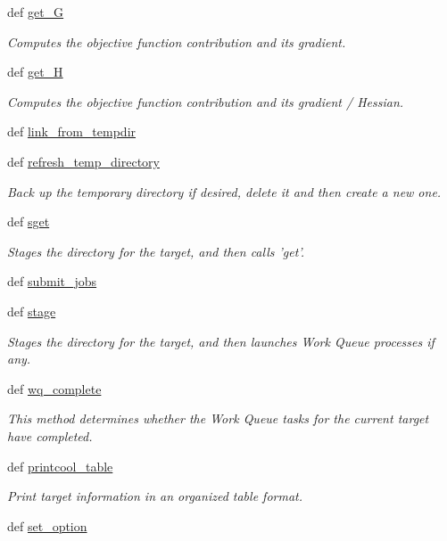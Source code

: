 \begin{DoxyCompactItemize}
def \hyperlink{classforcebalance_1_1target_1_1Target_afa8cc38c8bba8861c072e789717aa049}{get\-\_\-\-G}
\begin{DoxyCompactList}\small\item\em Computes the objective function contribution and its gradient. \end{DoxyCompactList}\item 
def \hyperlink{classforcebalance_1_1target_1_1Target_a1d2ee27fe86a09769c1816af23b09adb}{get\-\_\-\-H}
\begin{DoxyCompactList}\small\item\em Computes the objective function contribution and its gradient / Hessian. \end{DoxyCompactList}\item 
def \hyperlink{classforcebalance_1_1target_1_1Target_a5aa4958cea0a48138511567a076c5a82}{link\-\_\-from\-\_\-tempdir}
\item 
def \hyperlink{classforcebalance_1_1target_1_1Target_afe815eafab06ac92f10bbf4b88ad95c8}{refresh\-\_\-temp\-\_\-directory}
\begin{DoxyCompactList}\small\item\em Back up the temporary directory if desired, delete it and then create a new one. \end{DoxyCompactList}\item 
def \hyperlink{classforcebalance_1_1target_1_1Target_a51d58b55242bf4d4909c1837174f5f3c}{sget}
\begin{DoxyCompactList}\small\item\em Stages the directory for the target, and then calls 'get'. \end{DoxyCompactList}\item 
def \hyperlink{classforcebalance_1_1target_1_1Target_a78cd29b94cbcc201eed99c78aaef46a4}{submit\-\_\-jobs}
\item 
def \hyperlink{classforcebalance_1_1target_1_1Target_af8d2a4658c87841e40296795aec478bb}{stage}
\begin{DoxyCompactList}\small\item\em Stages the directory for the target, and then launches Work Queue processes if any. \end{DoxyCompactList}\item 
def \hyperlink{classforcebalance_1_1target_1_1Target_af6099ec09486213869dba2491bd8ea04}{wq\-\_\-complete}
\begin{DoxyCompactList}\small\item\em This method determines whether the Work Queue tasks for the current target have completed. \end{DoxyCompactList}\item 
def \hyperlink{classforcebalance_1_1target_1_1Target_ac30a4e9d7d9fe06f7caefa5f7cfab09b}{printcool\-\_\-table}
\begin{DoxyCompactList}\small\item\em Print target information in an organized table format. \end{DoxyCompactList}\item 
def \hyperlink{classforcebalance_1_1baseclass_1_1ForceBalanceBaseClass_abaaf4d99b043d41f02fabc41db59252b}{set\-\_\-option}
\end{DoxyCompactItemize}
